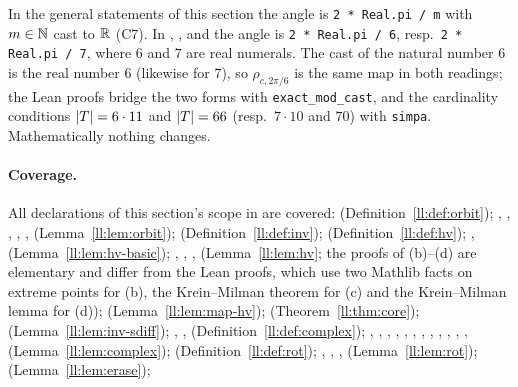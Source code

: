 \begin{remark}\label{ll:rem:numerals}
In the general statements of this section the angle is \texttt{2 * Real.pi / m} with $m\in\mathbb N$ cast to $\mathbb R$ (C7). In
, ,  and  the angle is
\texttt{2 * Real.pi / 6}, resp.\ \texttt{2 * Real.pi / 7}, where $6$ and $7$ are real numerals. The cast of the
natural number
$6$ is the real number $6$ (likewise for $7$), so $\rho_{c,2\pi/6}$ is the same map in both readings; the Lean proofs
bridge the two forms with \texttt{exact\_mod\_cast}, and the cardinality conditions $\lvert T\rvert=6\cdot 11$ and $\lvert T\rvert=66$
(resp.\ $7\cdot10$ and $70$) with \texttt{simpa}. Mathematically nothing changes.
\end{remark}

\paragraph{Coverage.}
All declarations of this section's scope in  are covered:
 (Definition~\ref{ll:def:orbit});
, , , ,
,  (Lemma~\ref{ll:lem:orbit});
 (Definition~\ref{ll:def:inv});
 (Definition~\ref{ll:def:hv}); , 
(Lemma~\ref{ll:lem:hv-basic}); , ,
,  (Lemma~\ref{ll:lem:hv}; the proofs of (b)--(d) are
elementary and differ from the Lean proofs, which use two Mathlib facts on extreme points for (b), the Krein--Milman
theorem for (c) and the Krein--Milman lemma for (d));
 (Lemma~\ref{ll:lem:map-hv});
 (Theorem~\ref{ll:thm:core});
 (Lemma~\ref{ll:lem:inv-sdiff});
, ,  (Definition~\ref{ll:def:complex});
, , , , , , ,
, , , , , 
(Lemma~\ref{ll:lem:complex});
 (Definition~\ref{ll:def:rot});
, , ,  (Lemma~\ref{ll:lem:rot});
 (Lemma~\ref{ll:lem:erase});
